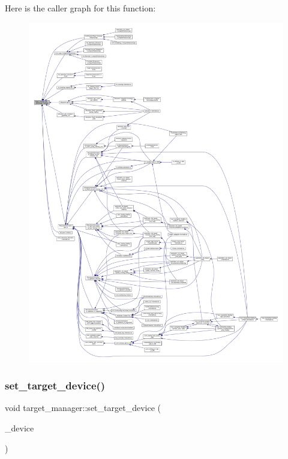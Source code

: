 Here is the caller graph for this function\+:
\nopagebreak
\begin{figure}[H]
\begin{center}
\leavevmode
\includegraphics[width=350pt]{da/d43/classtarget__manager_ab9bc56ace0f343c91dc10e9ca40a91e3_icgraph}
\end{center}
\end{figure}
\mbox{\label{classtarget__manager_aa58abbb383e12ce69562d9c6916f471c}} 
\subsubsection{\texorpdfstring{set\+\_\+target\+\_\+device()}{set\_target\_device()}}
{\footnotesize\ttfamily void target\+\_\+manager\+::set\+\_\+target\+\_\+device (\begin{DoxyParamCaption}\item[{const \hyperlink{target__device_8hpp_acedb2b7a617e27e6354a8049fee44eda}{target\+\_\+device\+Ref} \&}]{\+\_\+device }\end{DoxyParamCaption})}



